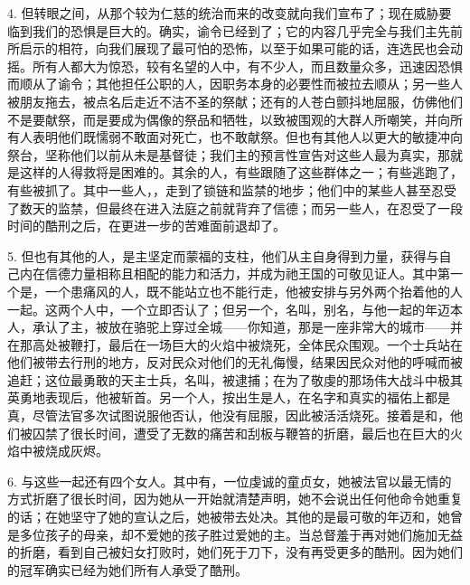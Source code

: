 4. 但转眼之间，从那个较为仁慈的统治而来的改变就向我们宣布了；现在威胁要临到我们的恐惧是巨大的。确实，谕令已经到了；它的内容几乎完全与我们主先前所启示的相符，向我们展现了最可怕的恐怖，以至于如果可能的话，连选民也会动摇。所有人都大为惊恐，较有名望的人中，有不少人，而且数量众多，迅速因恐惧而顺从了谕令；其他担任公职的人，因职务本身的必要性而被拉去顺从；另一些人被朋友拖去，被点名后走近不洁不圣的祭献；还有的人苍白颤抖地屈服，仿佛他们不是要献祭，而是要成为偶像的祭品和牺牲，以致被围观的大群人所嘲笑，并向所有人表明他们既懦弱不敢面对死亡，也不敢献祭。但也有其他人以更大的敏捷冲向祭台，坚称他们以前从未是基督徒；我们主的预言性宣告对这些人最为真实，那就是这样的人得救将是困难的。其余的人，有些跟随了这些群体之一；有些逃跑了，有些被抓了。其中一些人，，走到了锁链和监禁的地步；他们中的某些人甚至忍受了数天的监禁，但最终在进入法庭之前就背弃了信德；而另一些人，在忍受了一段时间的酷刑之后，在更进一步的苦难面前退却了。\par

5. 但也有其他的人，是主坚定而蒙福的支柱，他们从主自身得到力量，获得与自己内在信德力量相称且相配的能力和活力，并成为祂王国的可敬见证人。其中第一个是，一个患痛风的人，既不能站立也不能行走，他被安排与另外两个抬着他的人一起。这两个人中，一个立即否认了；但另一个，名叫，别名，与他一起的年迈本人，承认了主，被放在骆驼上穿过全城——你知道，那是一座非常大的城市——并在那高处被鞭打，最后在一场巨大的火焰中被烧死，全体民众围观。一个士兵站在他们被带去行刑的地方，反对民众对他们的无礼侮慢，结果因民众对他的呼喊而被追赶；这位最勇敢的天主士兵，名叫，被逮捕；在为了敬虔的那场伟大战斗中极其英勇地表现后，他被斩首。另一个人，按出生是人，在名字和真实的福佑上都是真，尽管法官多次试图说服他否认，他没有屈服，因此被活活烧死。接着是和，他们被囚禁了很长时间，遭受了无数的痛苦和刮板与鞭笞的折磨，最后也在巨大的火焰中被烧成灰烬。\par

6. 与这些一起还有四个女人。其中有，一位虔诚的童贞女，她被法官以最无情的方式折磨了很长时间，因为她从一开始就清楚声明，她不会说出任何他命令她重复的话；在她坚守了她的宣认之后，她被带去处决。其他的是最可敬的年迈和，她曾是多位孩子的母亲，却不爱她的孩子胜过爱她的主。当总督羞于再对她们施加无益的折磨，看到自己被妇女打败时，她们死于刀下，没有再受更多的酷刑。因为她们的冠军确实已经为她们所有人承受了酷刑。\par

